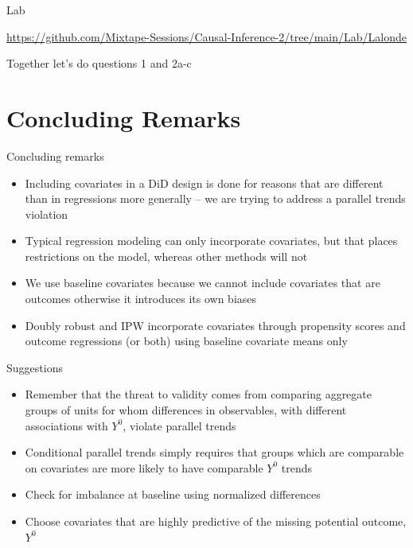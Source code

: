 \documentclass{beamer}
\begin{document}
\begin{frame}{Lab}

\url{https://github.com/Mixtape-Sessions/Causal-Inference-2/tree/main/Lab/Lalonde}

\bigskip

Together let's do questions 1 and 2a-c

\end{frame}


\section{Concluding Remarks}


\begin{frame}{Concluding remarks}

\begin{itemize}
\item Including covariates in a DiD design is done for reasons that are different than in regressions more generally -- we are trying to address a parallel trends violation
\item Typical regression modeling can only incorporate covariates, but that places restrictions on the model, whereas other methods will not
\item We use baseline covariates because we cannot include covariates that are outcomes otherwise it introduces its own biases
\item Doubly robust and IPW incorporate covariates through propensity scores and outcome regressions (or both) using baseline covariate means only
\end{itemize}

\end{frame}

\begin{frame}{Suggestions}

\begin{itemize}

\item Remember that the threat to validity comes from comparing aggregate groups of units for whom differences in observables, with different associations with $Y^0$, violate parallel trends
\item Conditional parallel trends simply requires that groups which are comparable on covariates are more likely to have comparable $Y^0$ trends
\item Check for imbalance at baseline using normalized differences
\item Choose covariates that are highly predictive of the missing potential outcome, $Y^0$

\end{itemize}

\end{frame}
\end{document}
